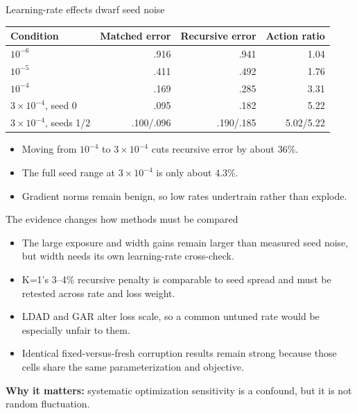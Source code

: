 \documentclass[aspectratio=169]{beamer}
\begin{document}
\begin{frame}{Learning-rate effects dwarf seed noise}
  \centering
  \begin{tabular}{lrrr}
    \toprule
    Condition & Matched error & Recursive error & Action ratio \\
    \midrule
    $10^{-6}$ & .916 & .941 & 1.04 \\
    $10^{-5}$ & .411 & .492 & 1.76 \\
    $10^{-4}$ & .169 & .285 & 3.31 \\
    $3\times10^{-4}$, seed 0 & .095 & .182 & 5.22 \\
    $3\times10^{-4}$, seeds 1/2 & .100/.096 & .190/.185 & 5.02/5.22 \\
    \bottomrule
  \end{tabular}
  \vfill
  \begin{itemize}
    \item Moving from $10^{-4}$ to $3\times10^{-4}$ cuts recursive error by about 36\%.
    \item The full seed range at $3\times10^{-4}$ is only about 4.3\%.
    \item Gradient norms remain benign, so low rates undertrain rather than explode.
  \end{itemize}
\end{frame}

\begin{frame}{The evidence changes how methods must be compared}
  \begin{itemize}
    \item The large exposure and width gains remain larger than measured seed noise, but width needs its own learning-rate cross-check.
    \item K=1's 3--4\% recursive penalty is comparable to seed spread and must be retested across rate and loss weight.
    \item LDAD and GAR alter loss scale, so a common untuned rate would be especially unfair to them.
    \item Identical fixed-versus-fresh corruption results remain strong because those cells share the same parameterization and objective.
  \end{itemize}
  \vfill
  \textbf{Why it matters:} systematic optimization sensitivity is a confound, but it is not random fluctuation.
\end{frame}
\end{document}
